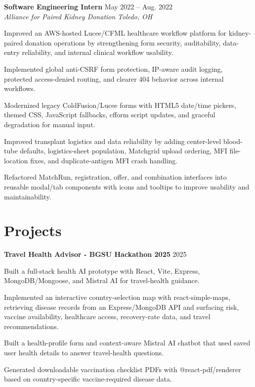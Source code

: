 \documentclass[letterpaper,10pt]{article}
\newcommand{\resumeSubheading}[4]{
  \vspace{2pt}
  \textbf{#1} \hfill #2\\
  \textit{#3} \hfill \textit{#4}
}
\newcommand{\projectHeading}[2]{
  \vspace{2pt}
  \textbf{#1} \hfill #2
}
\begin{document}
\resumeSubheading
{Software Engineering Intern}{May 2022 -- Aug. 2022}
{Alliance for Paired Kidney Donation}{Toledo, OH}
\begin{tightitemize}
  \item Improved an AWS-hosted Lucee/CFML healthcare workflow platform for kidney-paired donation operations by strengthening form security, auditability, data-entry reliability, and internal clinical workflow usability.
  \item Implemented global anti-CSRF form protection, IP-aware audit logging, protected access-denied routing, and clearer 404 behavior across internal workflows.
  \item Modernized legacy ColdFusion/Lucee forms with HTML5 date/time pickers, themed CSS, JavaScript fallbacks, cfform script updates, and graceful degradation for manual input.
  \item Improved transplant logistics and data reliability by adding center-level blood-tube defaults, logistics-sheet population, Matchgrid upload ordering, MFI file-location fixes, and duplicate-antigen MFI crash handling.
  \item Refactored MatchRun, registration, offer, and combination interfaces into reusable modal/tab components with icons and tooltips to improve usability and maintainability.
\end{tightitemize}

\section{Projects}
\projectHeading{Travel Health Advisor - BGSU Hackathon 2025}{2025}
\begin{tightitemize}
  \item Built a full-stack health AI prototype with React, Vite, Express, MongoDB/Mongoose, and Mistral AI for travel-health guidance.
  \item Implemented an interactive country-selection map with react-simple-maps, retrieving disease records from an Express/MongoDB API and surfacing risk, vaccine availability, healthcare access, recovery-rate data, and travel recommendations.
  \item Built a health-profile form and context-aware Mistral AI chatbot that used saved user health details to answer travel-health questions.
  \item Generated downloadable vaccination checklist PDFs with @react-pdf/renderer based on country-specific vaccine-required disease data.
\end{tightitemize}
\end{document}
